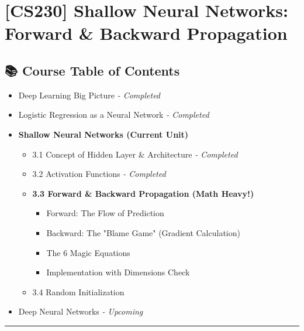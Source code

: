 \documentclass[11pt,a4paper]{book}
\theoremstyle{definition}
\begin{document}
\chapter{[CS230] Shallow Neural Networks: \\ Forward \& Backward Propagation}
\label{ch:lecture8}

\section*{📚 Course Table of Contents}
\begin{itemize}
    \item[Chapter 1.] Deep Learning Big Picture \textit{- Completed}
    \item[Chapter 2.] Logistic Regression as a Neural Network \textit{- Completed}
    \item[\textbf{Chapter 3.}] \textbf{Shallow Neural Networks (Current Unit)}
    \begin{itemize}
        \item 3.1 Concept of Hidden Layer \& Architecture \textit{- Completed}
        \item 3.2 Activation Functions \textit{- Completed}
        \item \textbf{3.3 Forward \& Backward Propagation (Math Heavy!)}
        \begin{itemize}
            \item Forward: The Flow of Prediction
            \item Backward: The "Blame Game" (Gradient Calculation)
            \item The 6 Magic Equations
            \item Implementation with Dimensions Check
        \end{itemize}
        \item 3.4 Random Initialization
    \end{itemize}
    \item[Chapter 4.] Deep Neural Networks \textit{- Upcoming}
\end{itemize}

\vspace{0.5cm}
\hrule
\vspace{0.5cm}
\end{document}
